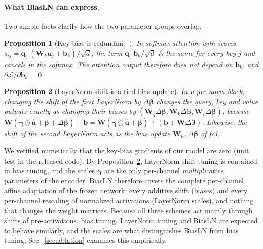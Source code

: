 \documentclass[fonts]{icst}
\newif\ifrevmark\revmarkfalse
\newenvironment{revblock}{\ifrevmark\color{revblue}\fi}{}
\newtheorem{proposition}{Proposition}
\begin{document}
\begin{revblock}
\paragraph{What BiasLN can express.}
\label{sec:analysis}
Two simple facts clarify how the two parameter groups overlap.

\begin{proposition}[Key bias is redundant~\cite{namazifar2023bias}]
\label{prop:key}
In softmax attention with scores $s_{ij}=\mathbf{q}_i^\top(\mathbf{W}_k\mathbf{u}_j+\mathbf{b}_k)/\sqrt{d}$, the term $\mathbf{q}_i^\top\mathbf{b}_k/\sqrt{d}$ is the same for every key $j$ and cancels in the softmax. The attention output therefore does not depend on $\mathbf{b}_k$, and $\partial\mathcal{L}/\partial\mathbf{b}_k=\mathbf{0}$.
\end{proposition}

\begin{proposition}[LayerNorm shift is a tied bias update]
\label{prop:fold}
In a pre-norm block, changing the shift of the first LayerNorm by $\Delta\boldsymbol{\beta}$ changes the query, key and value outputs exactly as changing their biases by $(\mathbf{W}_q\Delta\boldsymbol{\beta},\mathbf{W}_k\Delta\boldsymbol{\beta},\mathbf{W}_v\Delta\boldsymbol{\beta})$, because $\mathbf{W}(\boldsymbol{\gamma}\odot\hat{\mathbf{u}}+\boldsymbol{\beta}+\Delta\boldsymbol{\beta})+\mathbf{b}=\mathbf{W}(\boldsymbol{\gamma}\odot\hat{\mathbf{u}}+\boldsymbol{\beta})+(\mathbf{b}+\mathbf{W}\Delta\boldsymbol{\beta})$. Likewise, the shift of the second LayerNorm acts as the bias update $\mathbf{W}_{\mathrm{fc1}}\Delta\boldsymbol{\beta}$ of fc1.
\end{proposition}

We verified numerically that the key-bias gradients of our model are zero (unit test in the released code). By Proposition~\ref{prop:fold}, LayerNorm shift tuning is contained in bias tuning, and the scales $\boldsymbol{\gamma}$ are the only per-channel \emph{multiplicative} parameters of the encoder. BiasLN therefore covers the complete per-channel affine adaptation of the frozen network: every additive shift (biases) and every per-channel rescaling of normalized activations (LayerNorm scales), and nothing that changes the weight matrices. Because all three schemes act mainly through shifts of pre-activations, bias tuning, LayerNorm tuning and BiasLN are expected to behave similarly, and the scales are what distinguishes BiasLN from bias tuning; Sec.~\ref{sec:ablation} examines this empirically.
\end{revblock}
\end{document}
